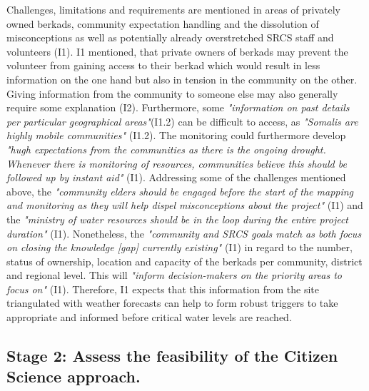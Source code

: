 Challenges, limitations and requirements are mentioned in areas of privately owned berkads, community expectation handling and the dissolution of misconceptions as well as potentially already overstretched SRCS staff and volunteers (I1). I1 mentioned, that private owners of berkads may prevent the volunteer from gaining access to their berkad which would result in less information on the one hand but also in tension in the community on the other. Giving information from the community to someone else may also generally require some explanation (I2). Furthermore, some \textit{"information on past details per particular geographical areas"}(I1.2) can be difficult to access, as \textit{"Somalis are highly mobile communities"} (I1.2). The monitoring could furthermore develop \textit{"hugh expectations from the communities as there is the ongoing drought. Whenever there is monitoring of resources, communities believe this should be followed up by instant aid"} (I1).\newline
Addressing some of the challenges mentioned above, the \textit{"community elders should be engaged before the start of the mapping and monitoring as they will help dispel misconceptions about the project"} (I1) and the \textit{"ministry of water resources should be in the loop during the entire project duration"} (I1). Nonetheless, the \textit{"community and SRCS goals match as both focus on closing the knowledge [gap] currently existing"} (I1) in regard to the number, status of ownership, location and capacity of the berkads per community, district and regional level. This will \textit{"inform decision-makers on the priority areas to focus on"} (I1). Therefore, I1 expects that this information from the site triangulated with weather forecasts can help to form robust triggers to take appropriate and informed  before critical water levels are reached.


\subsection{Stage 2: Assess the feasibility of the Citizen Science approach.}\label{subsec:stage2_appl}

